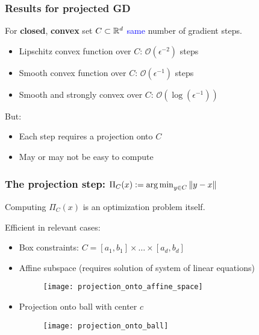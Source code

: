 \documentclass{beamer}
\begin{document}
\begin{frame}
  \frametitle{Results for projected GD}
  For \textbf{closed}, \textbf{convex} set $C\subset \mathbb{R}^d$ \textcolor{blue}{same} number of gradient steps.
  \begin{itemize}
    \item Lipschitz convex function over $C$: $\mathcal{O}(\epsilon^{-2})$ steps
    \item Smooth convex function over $C$: $\mathcal{O}(\epsilon^{-1})$ steps
    \item Smooth and strongly convex over $C$: $\mathcal{O}(\log(\epsilon^{-1}))$
  \end{itemize}

  But:
  \begin{itemize}
    \item Each step requires a projection onto $C$
    \item May or may not be easy to compute
  \end{itemize}

\end{frame}


\begin{frame}
  \frametitle{The projection step: $\Pi_C(x) := \operatorname*{arg\,min}_{y\in C} \Vert y-x \Vert$}
  Computing $\Pi_C(x)$ is an optimization problem itself.

  Efficient in relevant cases:
  \begin{itemize}
    \item Box constraints: $C= [a_1, b_1] \times \dots \times [a_d, b_d]$
    \item Affine subspace (requires solution of system of linear equations)
          \begin{figure}[ht]
            \centering
            \texttt{[image: projection\_onto\_affine\_space]}
          \end{figure}
    \item Projection onto ball with center $c$
          \begin{figure}[ht]
            \centering
            \texttt{[image: projection\_onto\_ball]}
          \end{figure}
  \end{itemize}
\end{frame}
\end{document}
